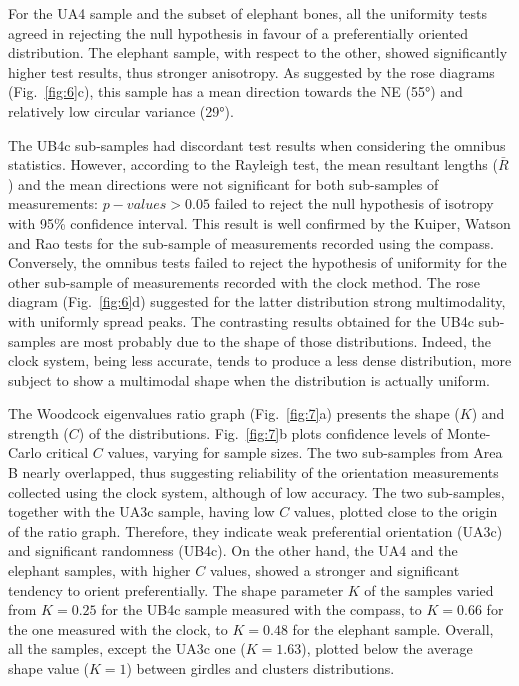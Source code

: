 \documentclass[preprint,authoryear,times]{elsarticle} %
\begin{document}
For the UA4 sample and the subset of elephant bones, all the uniformity tests agreed in rejecting the null hypothesis in favour of a preferentially oriented distribution. The elephant sample, with respect to the other, showed significantly higher test results, thus stronger anisotropy. As suggested by the rose diagrams (Fig.~\ref{fig:6}c), this sample has a mean direction towards the NE (55°) and relatively low circular variance (29°).

The UB4c sub-samples had discordant test results when considering the omnibus statistics. However, according to the Rayleigh test, the mean resultant lengths ($\bar{R}$) and the mean directions were not significant for both sub-samples of measurements: $p-values>0.05$ failed to reject the null hypothesis of isotropy with 95\% confidence interval. This result is well confirmed by the Kuiper, Watson and Rao tests for the sub-sample of measurements recorded using the compass. Conversely, the omnibus tests failed to reject the hypothesis of uniformity for the other sub-sample of measurements recorded with the clock method. The rose diagram (Fig.~\ref{fig:6}d) suggested for the latter distribution strong multimodality, with uniformly spread peaks. The contrasting results obtained for the UB4c sub-samples are most probably due to the shape of those distributions. Indeed, the clock system, being less accurate, tends to produce a less dense distribution, more subject to show a multimodal shape when the distribution is actually uniform.

The Woodcock eigenvalues ratio graph (Fig.~\ref{fig:7}a) presents the shape ($K$) and strength ($C$) of the distributions. Fig.~\ref{fig:7}b plots confidence levels of Monte-Carlo critical $C$ values, varying for sample sizes. The two sub-samples from Area B nearly overlapped, thus suggesting reliability of the orientation measurements collected using the clock system, although of low accuracy. The two sub-samples, together with the UA3c sample, having low $C$ values, plotted close to the origin of the ratio graph. Therefore, they indicate weak preferential orientation (UA3c) and significant randomness (UB4c). On the other hand, the UA4 and the elephant samples, with higher $C$ values, showed a stronger and significant tendency to orient preferentially. The shape parameter $K$ of the samples varied from $K=0.25$ for the UB4c sample measured with the compass, to $K=0.66$ for the one measured with the clock, to $K=0.48$ for the elephant sample. Overall, all the samples, except the UA3c one ($K=1.63$), plotted below the average shape value ($K=1$) between girdles and clusters distributions.
\end{document}
